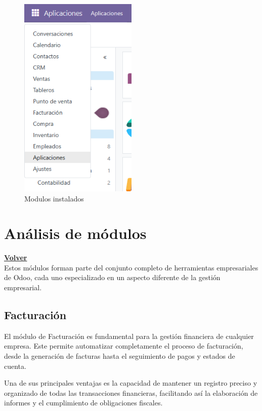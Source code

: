 \documentclass[a4paper,12pt]{article}
\begin{document}
\begin{figure}[h!]
    \centering
    \includegraphics[width=0.5\textwidth]{pr2odoo01-modulosInstalados.png}
    \caption{Modulos instalados}
\end{figure}
\FloatBarrier

\clearpage

\section{Análisis de módulos}
\hyperlink{anchor-indice}{\textbf{Volver}}\\

Estos módulos forman parte del conjunto completo de herramientas empresariales de Odoo, cada uno especializado en un aspecto diferente de la gestión empresarial.

\subsection{Facturación}

El módulo de Facturación es fundamental para la gestión financiera de cualquier empresa. Este permite automatizar completamente el proceso de facturación, desde la generación de facturas hasta el seguimiento de pagos y estados de cuenta.

Una de sus principales ventajas es la capacidad de mantener un registro preciso y organizado de todas las transacciones financieras, facilitando así la elaboración de informes y el cumplimiento de obligaciones fiscales.
\end{document}
